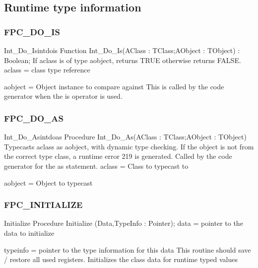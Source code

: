 \documentclass [12pt]{article}
\begin{document}
\subsection{Runtime type information}
\label{subsec:runtime}

\subsubsection{FPC{\_}DO{\_}IS}
\label{subsubsec:mylabel69}

\begin{functionl}{Int{\_}Do{\_}Is}{intdois}
\Declaration
Function Int{\_}Do{\_}Is(AClass : TClass;AObject : TObject) : Boolean;
\Description 
If \textsf{aclass} is of type \textsf{aobject}, returns TRUE otherwise
returns FALSE.
\Parameters 
aclass = class type reference \par
aobject = Object instance to compare against 
\Notes 
This is called by the code generator when the \textsf{is} operator is used. 
\Algorithm 
\end{functionl}

\subsubsection{FPC{\_}DO{\_}AS}
\label{subsubsec:mylabel70}

\begin{procedurel}{Int{\_}Do{\_}As}{intdoas}
\Declaration
Procedure Int{\_}Do{\_}As(AClass : TClass;AObject : TObject)
\Description 
Typecasts \textsf{aclass} as \textsf{aobject}, with dynamic type checking.
If the object is not from the correct type class, a runtime error 219 is
generated. Called by the code generator for the \textsf{as} statement.
\Parameters 
aclass = Class to typecast to \par 
aobject = Object to typecast 
\end{procedurel}

\subsubsection{FPC{\_}INITIALIZE }
\label{subsubsec:mylabel71}

\begin{procedure}{Initialize}
\Declaration
Procedure Initialize (Data,TypeInfo : Pointer);
\Description 
\Parameters
data = pointer to the data to initialize \par
typeinfo = pointer to the type information for this data 
\Notes 
This routine should save / restore all used registers. 
\Algorithm 
Initializes the class data for runtime typed values 
\end{procedure}
\end{document}

